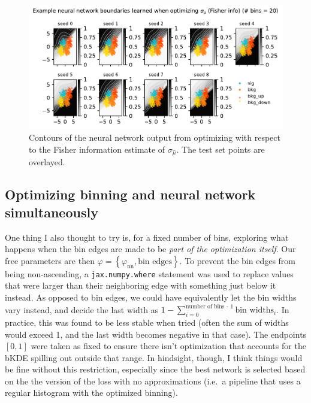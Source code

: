 \documentclass[
  11pt,
  numbers=noendperiod]{book}
\begin{document}
\begin{figure}

{\centering \includegraphics{./images/new-grid-models-poi_uncert-20nobin (1).pdf}

}

\caption{\label{fig-grid-20bin-poi-uncert}Contours of the neural network
output from optimizing with respect to the Fisher information estimate
of \(\sigma_{\hat{\mu}}\). The test set points are overlayed.}

\end{figure}

\hypertarget{optimizing-binning-and-neural-network-simultaneously}{%
\subsection{Optimizing binning and neural network
simultaneously}\label{optimizing-binning-and-neural-network-simultaneously}}

One thing I also thought to try is, for a fixed number of bins,
exploring what happens when the bin edges are made to be \emph{part of
the optimization itself}. Our free parameters are then
\(\varphi = \left\{\varphi_{\mathrm{nn}}, \text{bin edges}\right\}\). To
prevent the bin edges from being non-ascending, a
\texttt{jax.numpy.where} statement was used to replace values that were
larger than their neighboring edge with something just below it instead.
As opposed to bin edges, we could have equivalently let the bin widths
vary instead, and decide the last width as
\(1-\sum_{i=0}^{\text{number of bins - 1}} \text{bin widths}_i\). In
practice, this was found to be less stable when tried (often the sum of
widths would exceed 1, and the last width becomes negative in that
case). The endpoints \([0,1]\) were taken as fixed to ensure there isn't
optimization that accounts for the bKDE spilling out outside that range.
In hindsight, though, I think things would be fine without this
restriction, especially since the best network is selected based on the
the version of the loss with no approximations (i.e.~a pipeline that
uses a regular histogram with the optimized binning).
\end{document}
